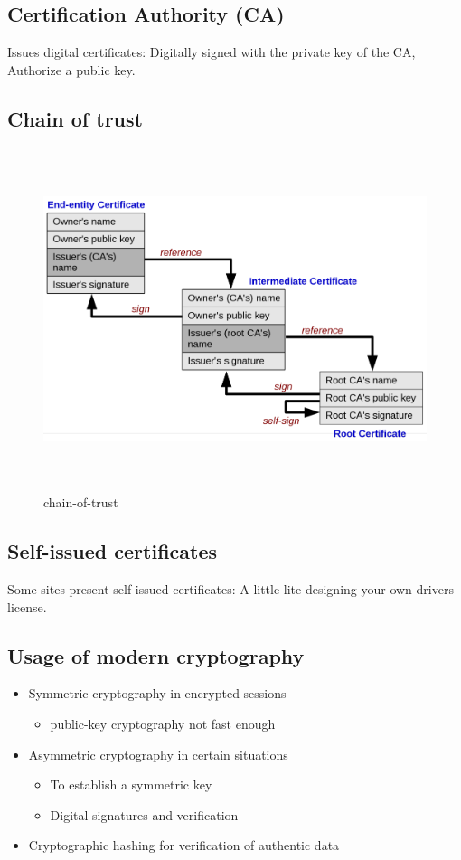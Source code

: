 \subsection{Certification Authority (CA)}
Issues digital certificates: Digitally signed with the private key of the CA,
Authorize a public key.

\subsection{Chain of trust}
\begin{figure}[h]
    \vspace{10mm}
    \centering
    \includegraphics[width=16cm, height=10cm]{image/chain-of-trust.png}
    \caption{chain-of-trust}
\end{figure}

\subsection{Self-issued certificates}
Some sites present self-issued certificates: A little lite designing your own drivers license.

\subsection{Usage of modern cryptography}
\begin{itemize}
\item Symmetric cryptography in encrypted sessions
  \begin{itemize}
    \item public-key cryptography not fast enough
  \end{itemize}
\item Asymmetric cryptography in certain situations
  \begin{itemize}
  \item To establish a symmetric key
  \item Digital signatures and verification
  \end{itemize}
\item Cryptographic hashing for verification of authentic data
\end{itemize}

